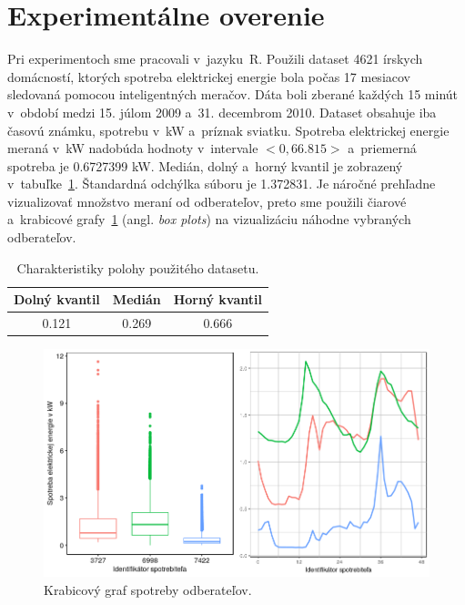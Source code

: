 \documentclass[a4paper,twoside,slovak,12pt,appendix]{article}
\begin{document}
\newpage\null\thispagestyle{empty}\newpage


\newpage
\section{Experimentálne overenie}
\label{c:experimental-verification}
Pri experimentoch sme pracovali v~jazyku~R. Použili dataset 4621 írskych
domácností, ktorých spotreba elektrickej energie bola počas 17 mesiacov
sledovaná pomocou inteligentných meračov. Dáta boli zberané každých 15 minút
v~období medzi 15. júlom 2009 a~31. decembrom 2010. Dataset obsahuje iba časovú
známku, spotrebu v~kW a~príznak sviatku. Spotreba elektrickej energie meraná
v~kW nadobúda hodnoty v~intervale $<0, 66.815>$ a~priemerná spotreba je
0.6727399 kW. Medián, dolný a~horný kvantil je zobrazený
v~tabuľke~\ref{tab:quantile}. Štandardná odchýlka súboru je 1.372831. Je náročné
prehľadne vizualizovať množstvo meraní od odberateľov, preto sme použili čiarové
a~krabicové grafy~\ref{fig:whole-plot} (angl. \textit{box plots}) na
vizualizáciu náhodne vybraných odberateľov.

\begin{table}[htbp]
  \centering
  \caption{Charakteristiky polohy použitého datasetu.}
  \label{tab:quantile}
  \begin{tabular}{|c|c|c|}
    \hline
    \textbf{Dolný kvantil}  &   \textbf{Medián}		&		\textbf{Horný kvantil} \\ \hline
    0.121								    &   0.269							&		0.666					         \\ \hline
  \end{tabular}
\end{table}

\begin{figure}[htbp]
  \centering
  \includegraphics[width=\textwidth]{sample_plot.png}
  \caption{Krabicový graf spotreby odberateľov.}
  \label{fig:whole-plot}
\end{figure}
\end{document}
